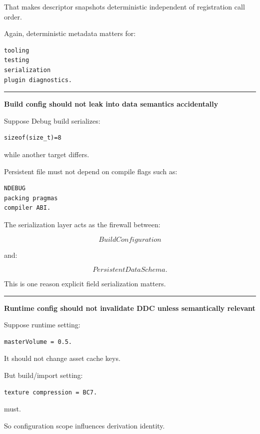 That makes descriptor snapshots deterministic independent of registration call order.

Again, deterministic metadata matters for:

\begin{verbatim}
tooling
testing
serialization
plugin diagnostics.
\end{verbatim}

\begin{center}\rule{0.5\linewidth}{0.5pt}\end{center}

\textbf{Build config should not leak into data semantics accidentally}

Suppose Debug build serializes:

\begin{verbatim}
sizeof(size_t)=8
\end{verbatim}

while another target differs.

Persistent file must not depend on compile flags such as:

\begin{verbatim}
NDEBUG
packing pragmas
compiler ABI.
\end{verbatim}

The serialization layer acts as the firewall between:

\[
BuildConfiguration
\]

and:

\[
PersistentDataSchema.
\]

This is one reason explicit field serialization matters.

\begin{center}\rule{0.5\linewidth}{0.5pt}\end{center}

\textbf{Runtime config should not invalidate DDC unless semantically relevant}

Suppose runtime setting:

\begin{verbatim}
masterVolume = 0.5.
\end{verbatim}

It should not change asset cache keys.

But build/import setting:

\begin{verbatim}
texture compression = BC7.
\end{verbatim}

must.

So configuration scope influences derivation identity.


